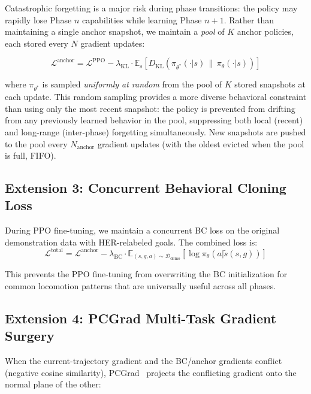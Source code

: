 \documentclass[11pt,a4paper]{article}
\begin{document}
Catastrophic forgetting is a major risk during phase transitions: the policy may rapidly lose Phase $n$ capabilities while learning Phase $n+1$.
Rather than maintaining a single anchor snapshot, we maintain a \emph{pool} of $K$ anchor policies, each stored every $N$ gradient updates:

\begin{equation}
\mathcal{L}^{\text{anchor}} = \mathcal{L}^{\text{PPO}} - \lambda_{\text{KL}} \cdot \mathbb{E}_s\!\left[D_{\text{KL}}(\pi_{\theta^*}(\cdot|s) \,\|\, \pi_\theta(\cdot|s))\right]
\label{eq:anchor-kl}
\end{equation}

where $\pi_{\theta^*}$ is sampled \emph{uniformly at random} from the pool of $K$ stored snapshots at each update.
This random sampling provides a more diverse behavioral constraint than using only the most recent snapshot: the policy is prevented from drifting from any previously learned behavior in the pool, suppressing both local (recent) and long-range (inter-phase) forgetting simultaneously.
New snapshots are pushed to the pool every $N_{\text{anchor}}$ gradient updates (with the oldest evicted when the pool is full, FIFO).

\subsection{Extension 3: Concurrent Behavioral Cloning Loss}

During PPO fine-tuning, we maintain a concurrent BC loss on the original demonstration data with HER-relabeled goals.
The combined loss is:
\begin{equation}
\mathcal{L}^{\text{total}} = \mathcal{L}^{\text{anchor}} - \lambda_{\text{BC}} \cdot \mathbb{E}_{(s,g,a) \sim \mathcal{D}_{\text{demo}}}\!\left[\log \pi_\theta(a | \tilde{s}(s, g))\right]
\label{eq:total-loss}
\end{equation}

This prevents the PPO fine-tuning from overwriting the BC initialization for common locomotion patterns that are universally useful across all phases.

\subsection{Extension 4: PCGrad Multi-Task Gradient Surgery}

When the current-trajectory gradient and the BC/anchor gradients conflict (negative cosine similarity), PCGrad~\cite{yu2020gradient} projects the conflicting gradient onto the normal plane of the other:
\end{document}
